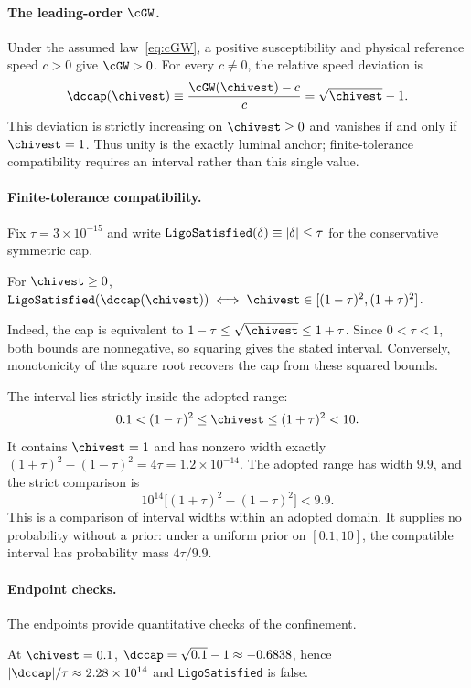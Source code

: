 \paragraph{The leading-order $\cGW$.}
Under the assumed law~\eqref{eq:cGW}, a positive susceptibility
and physical reference speed $c>0$ give $\cGW>0$.
For every $c\ne0$, the relative speed deviation is
\[
  \dccap(\chivest)
  \equiv \frac{\cGW(\chivest)-c}{c}
  = \sqrt{\chivest}-1.
\]
This deviation is strictly increasing on $\chivest\geq0$ and
vanishes if and only if $\chivest=1$. Thus unity is the exactly
luminal anchor; finite-tolerance compatibility requires an interval
rather than this single value.

\paragraph{Finite-tolerance compatibility.}
Fix $\tau=3\times10^{-15}$ and write
$\verb|LigoSatisfied|(\delta)\equiv|\delta|\leq\tau$
for the conservative symmetric cap.

\begin{theorem}
  \label{thm:bicond}
  For $\chivest\geq0$,
  $\verb|LigoSatisfied|(\dccap(\chivest))
  \;\Longleftrightarrow\;
  \chivest\in[(1-\tau)^2,(1+\tau)^2]$.
\end{theorem}

Indeed, the cap is equivalent to
$1-\tau\leq\sqrt{\chivest}\leq1+\tau$.
Since $0<\tau<1$, both bounds are nonnegative, so squaring
gives the stated interval. Conversely, monotonicity of the
square root recovers the cap from these squared bounds.

The interval lies strictly inside the adopted range:
\[
  0.1<(1-\tau)^2\leq\chivest\leq(1+\tau)^2<10.
\]
It contains $\chivest=1$ and has nonzero width exactly
$(1+\tau)^2-(1-\tau)^2=4\tau=1.2\times10^{-14}$.
The adopted range has width $9.9$, and the strict comparison is
\[
  10^{14}\bigl[(1+\tau)^2-(1-\tau)^2\bigr]<9.9.
\]
This is a comparison of interval widths within an adopted domain.
It supplies no probability without a prior: under a uniform prior
on $[0.1,10]$, the compatible interval has probability mass
$4\tau/9.9$.

\paragraph{Endpoint checks.}
The endpoints provide quantitative checks of the confinement.

\begin{theorem}
  \label{thm:falsifier-lower}
  At $\chivest=0.1$, $\dccap=\sqrt{0.1}-1\approx-0.6838$,
  hence $|\dccap|/\tau\approx2.28\times10^{14}$ and
  \verb|LigoSatisfied| is false.
\end{theorem}

